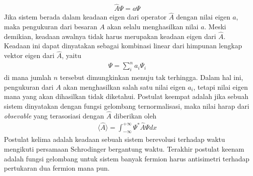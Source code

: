 \begin{align}
    \hat{A}\Psi = a\Psi
\end{align}
Jika sistem berada dalam keadaan eigen dari operator \(\hat{A}\) dengan nilai eigen \(a\), maka pengukuran dari besaran \(A\) akan selalu menghasilkan nilai \(a\). Meski demikian, keadaan awalnya tidak harus merupakan keadaan eigen dari \(\hat{A}\). Keadaan ini dapat dinyatakan sebagai kombinasi linear dari himpunan lengkap vektor eigen dari \(\hat{A}\), yaitu
\begin{align}
    \Psi = \sum_i^n a_i \Psi_i
\end{align}
di mana jumlah \(n\) tersebut dimungkinkan menuju tak terhingga. Dalam hal ini, pengukuran dari \(A\) akan menghasilkan salah satu nilai eigen \(a_i\), tetapi nilai eigen mana yang akan dihasilkan tidak diketahui. Postulat keempat adalah jika sebuah sistem dinyatakan dengan fungsi gelombang ternormalisasi, maka nilai harap dari \textit{obsevable} yang terasosiasi dengan \(\hat{A}\) diberikan oleh
\begin{align}
    \langle \hat{A} \rangle = \int_{-\infty}^{+\infty}\Psi^* \hat{A} \Psi dx
\end{align}
Postulat kelima adalah keadaan sebuah sistem berevolusi terhadap waktu mengikuti persamaan Schrodinger bergantung waktu. Terakhir postulat keenam adalah fungsi gelombang untuk sistem banyak fermion harus antisimetri terhadap pertukaran dua fermion mana pun. \cite{Zettili2009Quantum}

